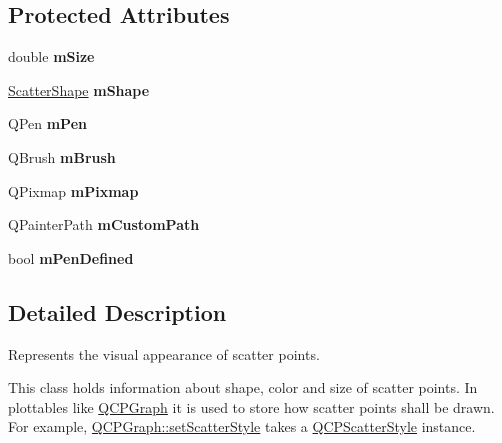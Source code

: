 \subsection*{Protected Attributes}
\begin{DoxyCompactItemize}
\item 
double {\bfseries m\+Size}\hypertarget{classQCPScatterStyle_a757da98671eb06b221979373ac2cec91}{}\label{classQCPScatterStyle_a757da98671eb06b221979373ac2cec91}

\item 
\hyperlink{classQCPScatterStyle_adb31525af6b680e6f1b7472e43859349}{Scatter\+Shape} {\bfseries m\+Shape}\hypertarget{classQCPScatterStyle_af1b327f35f107ed108290187bbc8c7c6}{}\label{classQCPScatterStyle_af1b327f35f107ed108290187bbc8c7c6}

\item 
Q\+Pen {\bfseries m\+Pen}\hypertarget{classQCPScatterStyle_a0f6a85e6d1e3ae1ca1b6efb4d4cdfe17}{}\label{classQCPScatterStyle_a0f6a85e6d1e3ae1ca1b6efb4d4cdfe17}

\item 
Q\+Brush {\bfseries m\+Brush}\hypertarget{classQCPScatterStyle_a1b9c6ab10aebcaf236f1f45d1d6d64d1}{}\label{classQCPScatterStyle_a1b9c6ab10aebcaf236f1f45d1d6d64d1}

\item 
Q\+Pixmap {\bfseries m\+Pixmap}\hypertarget{classQCPScatterStyle_a7697346c89b19d4cd1d8dd33319ec9e3}{}\label{classQCPScatterStyle_a7697346c89b19d4cd1d8dd33319ec9e3}

\item 
Q\+Painter\+Path {\bfseries m\+Custom\+Path}\hypertarget{classQCPScatterStyle_a813cb074744dc5a2f59cc99d6a10c6f0}{}\label{classQCPScatterStyle_a813cb074744dc5a2f59cc99d6a10c6f0}

\item 
bool {\bfseries m\+Pen\+Defined}\hypertarget{classQCPScatterStyle_a84ef5aa591ddba07b440f597e1669e78}{}\label{classQCPScatterStyle_a84ef5aa591ddba07b440f597e1669e78}

\end{DoxyCompactItemize}


\subsection{Detailed Description}
Represents the visual appearance of scatter points. 

This class holds information about shape, color and size of scatter points. In plottables like \hyperlink{classQCPGraph}{Q\+C\+P\+Graph} it is used to store how scatter points shall be drawn. For example, \hyperlink{classQCPGraph_a12bd17a8ba21983163ec5d8f42a9fea5}{Q\+C\+P\+Graph\+::set\+Scatter\+Style} takes a \hyperlink{classQCPScatterStyle}{Q\+C\+P\+Scatter\+Style} instance.

